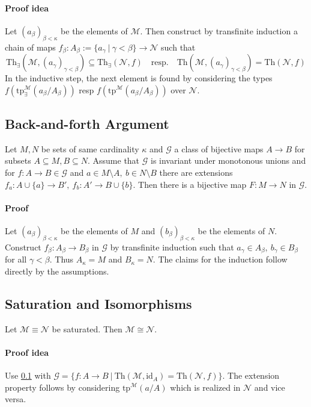 \documentclass{scrartcl}
\begin{document}
\paragraph{Proof idea} Let $(a_\beta)_{\beta < \kappa}$ be the elements of $\mathcal{M}$. 
Then construct by transfinite induction a chain of maps $f_\beta: A_\beta := \{a_\gamma \ | \ \gamma < \beta\} \to \mathcal{N}$ such that
\begin{equation*}
    \mathrm{Th}_\exists(\mathcal{M}, (a_\gamma)_{\gamma < \beta}) \subseteq \mathrm{Th}_\exists(\mathcal{N}, f) \quad \text{resp.} \quad \mathrm{Th}(\mathcal{M}, (a_\gamma)_{\gamma < \beta}) = \mathrm{Th}(\mathcal{N}, f)
\end{equation*}
In the inductive step, the next element is found by considering the types $f(\mathrm{tp}_\exists^{\mathcal{M}}(a_\beta / A_\beta))$ resp $f(\mathrm{tp}^{\mathcal{M}}(a_\beta / A_\beta))$ over $\mathcal{N}$.

\subsection{Back-and-forth Argument}
\label{back_and_forth}
Let $M, N$ be sets of same cardinality $\kappa$ and $\mathcal{G}$ a class of bijective maps $A \to B$ for subsets $A \subseteq M, B \subseteq N$.
Assume that $\mathcal{G}$ is invariant under monotonous unions and for $f: A \to B \in \mathcal{G}$ and $a \in M \setminus A, \ b \in N \setminus B$ there are extensions $f_a: A \cup \{a\} \to B', \ f_b: A' \to B \cup \{b\}$.
Then there is a bijective map $F: M \to N$ in $\mathcal{G}$.
\paragraph{Proof} Let $(a_\beta)_{\beta < \kappa}$ be the elements of $M$ and $(b_\beta)_{\beta < \kappa}$ be the elements of $N$.
Construct $f_\beta: A_\beta \to B_\beta$ in $\mathcal{G}$ by transfinite induction such that $a_\gamma \in A_\beta, \ b_\gamma \in B_\beta$ for all $\gamma < \beta$.
Thus $A_\kappa = M$ and $B_\kappa = N$. The claims for the induction follow directly by the assumptions.

\subsection{Saturation and Isomorphisms}
Let $\mathcal{M} \equiv \mathcal{N}$ be saturated. Then $\mathcal{M} \cong \mathcal{N}$.
\paragraph{Proof idea} 
Use \ref{back_and_forth} with $\mathcal{G} = \{ f: A \to B \ | \ \mathrm{Th}(\mathcal{M}, \mathrm{id}_A) = \mathrm{Th}(\mathcal{N}, f)\}$.
The extension property follows by considering $\mathrm{tp}^{\mathcal{M}}(a/A)$ which is realized in $\mathcal{N}$ and vice versa.
\end{document}
